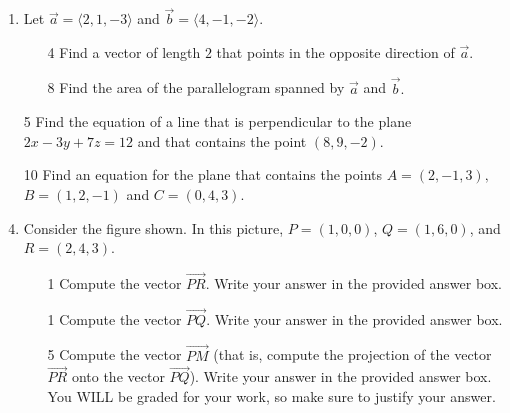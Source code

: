 \documentclass[addpoints,12pt]{exam}
\begin{document}
\begin{enumerate}
\item Let $\vec{a} = \langle 2, 1, -3 \rangle$ and $\vec{b} = \langle 4, -1, -2 \rangle.$
\begin{itemize}
\item[4] Find a vector of length $2$ that points in the opposite direction of $\vec{a}.$
\vfill
\item[8] Find the area of the parallelogram spanned by $\vec{a}$ and $\vec{b}.$
\vfill
\vfill
\end{itemize}
\newpage
\item[5] Find the equation of a line that is perpendicular to the plane $2x -3y+7z = 12$ and
that contains the point $(8, 9, -2).$
\vfill
\item[10] Find an equation for the plane that contains the points $A = (2,-1,3),$ $B = (1, 2,
-1)$ and $C = (0, 4, 3).$
\vfill
\vfill
\vfill
\newpage
\item Consider the figure shown. In this picture, $P = (1,0,0)$, $Q = (1,6,0)$, and $R =
(2,4,3)$.
\begin{itemize}
\item[1] Compute the vector $\overrightarrow{PR}$. Write your answer in the provided answer
box.
\vfill
\begin{flushright}
\end{flushright}
\item[1] Compute the vector $\overrightarrow{PQ}$. Write your answer in the provided answer
box.
\vfill
\begin{flushright}
\end{flushright}
\item[5] Compute the vector $\overrightarrow{PM}$ (that is, compute the projection of the vector
$\overrightarrow{PR}$ onto the vector $\overrightarrow{PQ}$). Write your answer in the
provided answer box. You WILL be graded for your work, so make sure to justify your answer.
\vfill
\vfill
\vfill
\vspace{0.1in}
\begin{flushright}

\end{flushright}
\end{itemize}
\end{enumerate}
\end{document}
